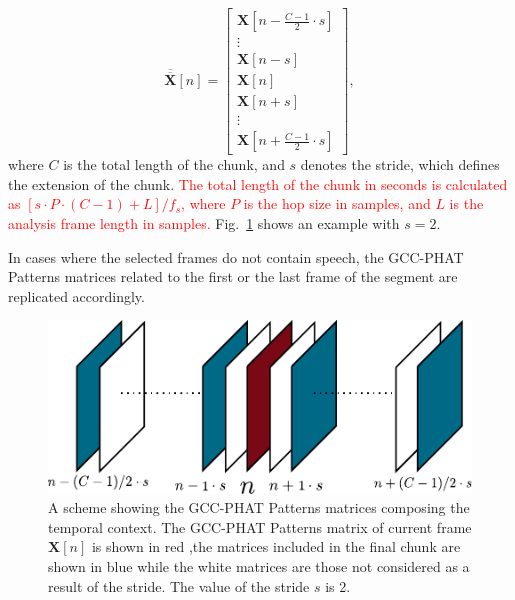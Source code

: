 \documentclass[review]{elsarticle}
\newcommand{\figref}[1]{Fig.~\ref{#1}}
\begin{document}
\begin{equation}
\overline{\overline{\mathbf{X}}}[n]= \left [ \begin{array}{c} 
\mathbf{X}[n -  \frac{C-1}{2} \cdot s]\\
\vdots\\
\mathbf{X}[n - s]\\
\mathbf{X}[n]\\
\mathbf{X}[n+s]\\
\vdots\\
\mathbf{X}[n + \frac{C-1}{2} \cdot s]
\end{array}
\right ],
\end{equation}
where $C$ is the total length of the chunk, and $s$ denotes the stride, which defines the extension of the chunk.  \textcolor{red}{The total length of the chunk in seconds is calculated as $\left [s\cdot P \cdot(C-1)+L \right ]/f_s$, where $P$ is the hop size in samples, and $L$ is the analysis frame length in samples.} \figref{fig:cxt_str} shows an example with $s=2$.

In cases where the selected frames do not contain speech, the GCC-PHAT Patterns matrices related to the first or the last frame of the segment are replicated accordingly.

\begin{figure}[h] 
	\centering
	\includegraphics[width=0.65\columnwidth]{imgs/cxt_str}
	\caption{A scheme showing the GCC-PHAT Patterns matrices composing the temporal context. The GCC-PHAT Patterns matrix of current frame $\mathbf{X}[n]$ is shown in red ,the matrices included in the final chunk are shown in blue while the white matrices are those not considered as a result of the stride. The value of the stride $s$ is 2.}
	\label{fig:cxt_str}
\end{figure} 
\end{document}
